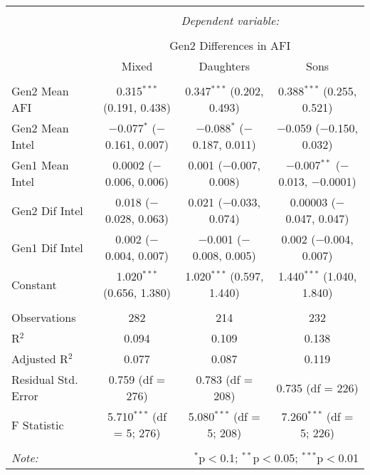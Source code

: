 
\begingroup 
\small 
\begin{tabular}{@{\extracolsep{1pt}}lccc} 
\\[-1.8ex]\hline 
\hline \\[-1.8ex] 
 & \multicolumn{3}{c}{\textit{Dependent variable:}} \\ 
\cline{2-4} 
\\[-1.8ex] & \multicolumn{3}{c}{Gen2 Differences in AFI} \\ 
 & Mixed & Daughters & Sons \\ 
\hline \\[-1.8ex] 
 Gen2 Mean AFI & 0.315$^{***}$ (0.191, 0.438) & 0.347$^{***}$ (0.202, 0.493) & 0.388$^{***}$ (0.255, 0.521) \\ 
  Gen2 Mean Intel & $-$0.077$^{*}$ ($-$0.161, 0.007) & $-$0.088$^{*}$ ($-$0.187, 0.011) & $-$0.059 ($-$0.150, 0.032) \\ 
  Gen1 Mean Intel & 0.0002 ($-$0.006, 0.006) & 0.001 ($-$0.007, 0.008) & $-$0.007$^{**}$ ($-$0.013, $-$0.0001) \\ 
  Gen2 Dif Intel & 0.018 ($-$0.028, 0.063) & 0.021 ($-$0.033, 0.074) & 0.00003 ($-$0.047, 0.047) \\ 
  Gen1 Dif Intel & 0.002 ($-$0.004, 0.007) & $-$0.001 ($-$0.008, 0.005) & 0.002 ($-$0.004, 0.007) \\ 
  Constant & 1.020$^{***}$ (0.656, 1.380) & 1.020$^{***}$ (0.597, 1.440) & 1.440$^{***}$ (1.040, 1.840) \\ 
 \hline \\[-1.8ex] 
Observations & 282 & 214 & 232 \\ 
R$^{2}$ & 0.094 & 0.109 & 0.138 \\ 
Adjusted R$^{2}$ & 0.077 & 0.087 & 0.119 \\ 
Residual Std. Error & 0.759 (df = 276) & 0.783 (df = 208) & 0.735 (df = 226) \\ 
F Statistic & 5.710$^{***}$ (df = 5; 276) & 5.080$^{***}$ (df = 5; 208) & 7.260$^{***}$ (df = 5; 226) \\ 
\hline 
\hline \\[-1.8ex] 
\textit{Note:}  & \multicolumn{3}{r}{$^{*}$p$<$0.1; $^{**}$p$<$0.05; $^{***}$p$<$0.01} \\ 
\end{tabular} 
\endgroup 
